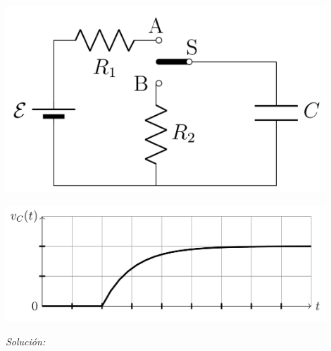 \begin{center}
    \includegraphics[width=12cm]{files/img3}
\end{center}
\begin{center}
    \includegraphics[width=12cm]{files/img4}
\end{center}

\vspace{20px}
\textit{Solución:}
\\